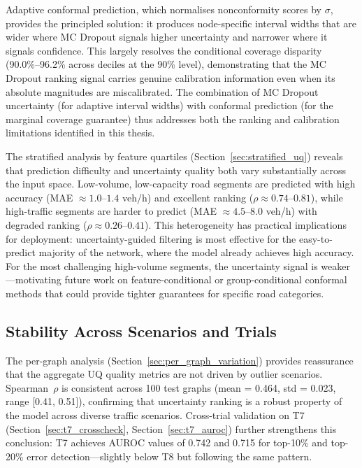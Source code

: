 Adaptive conformal prediction, which normalises nonconformity scores by $\sigma$, provides the principled solution: it produces node-specific interval widths that are wider where MC Dropout signals higher uncertainty and narrower where it signals confidence. This largely resolves the conditional coverage disparity (90.0\%--96.2\% across deciles at the 90\% level), demonstrating that the MC Dropout ranking signal carries genuine calibration information even when its absolute magnitudes are miscalibrated. The combination of MC Dropout uncertainty (for adaptive interval widths) with conformal prediction (for the marginal coverage guarantee) thus addresses both the ranking and calibration limitations identified in this thesis.

The stratified analysis by feature quartiles (Section~\ref{sec:stratified_uq}) reveals that prediction difficulty and uncertainty quality both vary substantially across the input space. Low-volume, low-capacity road segments are predicted with high accuracy (MAE $\approx 1.0$--$1.4$ veh/h) and excellent ranking ($\rho \approx 0.74$--$0.81$), while high-traffic segments are harder to predict (MAE $\approx 4.5$--$8.0$ veh/h) with degraded ranking ($\rho \approx 0.26$--$0.41$). This heterogeneity has practical implications for deployment: uncertainty-guided filtering is most effective for the easy-to-predict majority of the network, where the model already achieves high accuracy. For the most challenging high-volume segments, the uncertainty signal is weaker---motivating future work on feature-conditional or group-conditional conformal methods that could provide tighter guarantees for specific road categories.

\subsection{Stability Across Scenarios and Trials}

The per-graph analysis (Section~\ref{sec:per_graph_variation}) provides reassurance that the aggregate UQ quality metrics are not driven by outlier scenarios. Spearman~$\rho$ is consistent across 100 test graphs (mean = 0.464, std = 0.023, range [0.41, 0.51]), confirming that uncertainty ranking is a robust property of the model across diverse traffic scenarios. Cross-trial validation on T7 (Section~\ref{sec:t7_crosscheck}, Section~\ref{sec:t7_auroc}) further strengthens this conclusion: T7 achieves AUROC values of 0.742 and 0.715 for top-10\% and top-20\% error detection---slightly below T8 but following the same pattern.

